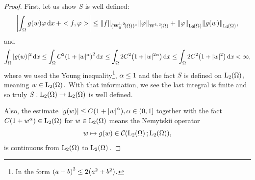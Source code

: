 \documentclass{article}
\begin{document}
\begin{example}
\begin{proof}
		First, let us show $S$ is well defined:
		\[
			\abs{\int_{\Omega}g(w) \varphi\dd{x} + <f, \varphi>} \leq \norm{f}_{(\WkpzeroSet[1][2]{\Omega})^{*}} \norm{\varphi}_{\WkpSet[1][2]{\Omega}} + \norm{\varphi}_{\LpSet[2]{\Omega}} \norm{g(w)}_{\LpSet[2]{\Omega}},
		\] and
		\[
			\int_{\Omega}|g(w)|^{2}\dd{x} \leq \int_{\Omega}C^{2}\qty(1+|w|^{\alpha})^{2}\dd{x} \leq \int_{\Omega}2C^{2}\qty(1+|w|^{2 \alpha})\dd{x} \leq \int_{\Omega}2C^{2}\qty(1+|w|^2)\dd{x} < \infty,
		\]
		where we used the Young inequality\footnote{In the form $\qty(a+b)^{2} \leq 2\qty(a^{2}+b^{2}).$}, $\alpha \leq 1$ and the fact $S$ is defined on $\LpSet[2]{\Omega},$ meaning $w \in \LpSet[2]{\Omega}.$ With that information, we see the last integral is finite and so truly $S: \LpSet[2]{\Omega} \to \LpSet[2]{\Omega}$ is well defined.

		Also, the estimate $\abs{g(w)} \leq C(1+\abs{w}^{\alpha}), \alpha \in (0,1]$ together with the fact $C(1+w^{\alpha}) \in \LpSet[2]{\Omega}$ for $w \in \LpSet[2]{\Omega}$ means the Nemytskii operator
		\[
			w \mapsto g(w) \in \mathcal{C}\qty(\LpSet[2]{\Omega}; \LpSet[2]{\Omega}),
		\]
		is continuous from $\LpSet[2]{\Omega}$ to $\LpSet[2]{\Omega}.$


\end{proof}
\end{example}
\end{document}
